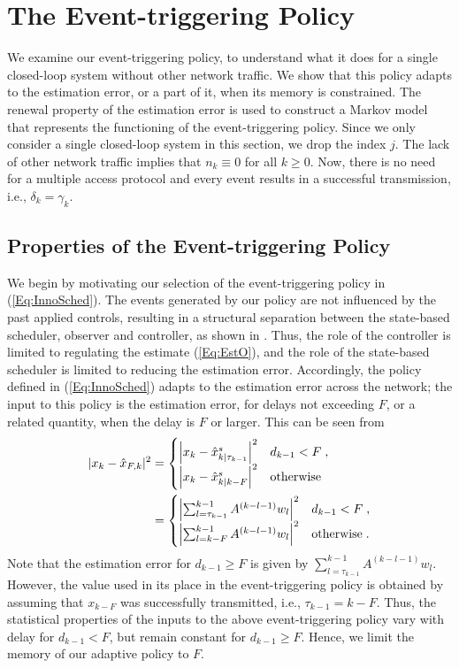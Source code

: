 \documentclass[journal]{IEEEtran}
\begin{document}
\section{The Event-triggering Policy} \label{S:ETprop}

We examine our event-triggering policy, to understand what it does for a single closed-loop system without other network traffic. We show that this policy adapts to the estimation error, or a part of it, when its memory is constrained. The renewal property of the estimation error is used to construct a Markov model that represents the functioning of the event-triggering policy. Since we only consider a single closed-loop system in this section, we drop the index $j$. The lack of other network traffic implies that $n_k \equiv 0$ for all $k \ge 0$. Now, there is no need for a multiple access protocol and every event results in a successful transmission, i.e., $\delta_k = \gamma_k$.

\subsection{Properties of the Event-triggering Policy}
We begin by motivating our selection of the event-triggering policy in (\ref{Eq:InnoSched}). The events generated by our policy are not influenced by the past applied controls, resulting in a structural separation between the state-based scheduler, observer and controller, as shown in \cite{Ramesh2013}. Thus, the role of the controller is limited to regulating the estimate (\ref{Eq:EstO}), and the role of the state-based scheduler is limited to reducing the estimation error. Accordingly, the policy defined in (\ref{Eq:InnoSched}) adapts to the estimation error across the network; the input to this policy is the estimation error, for delays not exceeding $F$, or a related quantity, when the delay is $F$ or larger. This can be seen from
\begin{align}
|x_k-\hat{x}_{F,k}|^2 &= \begin{cases}
\left| x_k-\hat{x}^{s}_{k|\tau_{k-1}} \right|^2 & d_{k-1} < F \; , \\
\left| x_k-\hat{x}^{s}_{k|k-F} \right|^2 & \textrm{otherwise}
\end{cases} \notag \\
&= \begin{cases}
\left| \sum_{l=\tau_{k-1}}^{k-1} A^{(k-l-1)} w_{l} \right|^2 & d_{k-1} < F \; , \\
\left| \sum_{l=k-F}^{k-1} A^{(k-l-1)} w_{l} \right|^2 & \textrm{otherwise} \; .
\end{cases} \label{Eq:ETesterrip}
\end{align}
Note that the estimation error for $d_{k-1} \ge F$ is given by $\sum_{l=\tau_{k-1}}^{k-1} A^{(k-l-1)} w_{l}$. However, the value used in its place in the event-triggering policy is obtained by assuming that $x_{k-F}$ was successfully transmitted, i.e., $\tau_{k-1} = k-F$. Thus, the statistical properties of the inputs to the above event-triggering policy vary with delay for $d_{k-1} < F$, but remain constant for $d_{k-1} \ge F$. Hence, we limit the memory of our adaptive policy to $F$.
\end{document}

